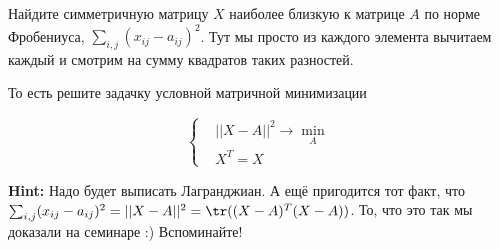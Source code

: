 \begin{problem}{}
	Найдите симметричную матрицу $X$ наиболее близкую к матрице $A$ по норме Фробениуса, $\sum_{i,j} (x_{ij} - a_{ij})^2$. Тут мы просто из каждого элемента вычитаем каждый и смотрим на сумму квадратов таких разностей. 
	
	То есть решите задачку условной матричной минимизации 
	
	\begin{equation*}
	\begin{cases}
	& ||X - A||^2 \to \min_{A}  \\
	& X^T = X
	\end{cases}
	\end{equation*}
	
	\textbf{Hint:} Надо будет выписать Лагранджиан.  А ещё пригодится тот факт, что $\sum_{i,j} (x_{ij} - a_{ij})^2 = ||X-A||^2 =  \tr((X-A)^T (X-A))$. То, что это так мы доказали на семинаре :) Вспоминайте! 
\end{problem}


